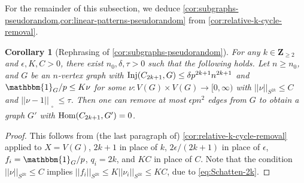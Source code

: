 \documentclass[reqno,11pt]{amsart}
\newtheorem{corollary}[theorem]{Corollary}
\theoremstyle{definition}
\theoremstyle{remark}
\newtheorem*{remark}{Remark}
\numberwithin{equation}{section}
\newcommand{\Z}{\mathbf{Z}}
\newcommand{\one}{\mathbbm{1}}
\newcommand{\sq}{_{\substack{ \\ \square}}}
\newcommand{\Hom}{\textnormal{Hom}}
\newcommand{\Inj}{\textnormal{Inj}}
\begin{document}
For the remainder of this subsection, we deduce \cref{cor:subgraphs-pseudorandom,cor:linear-patterns-pseudorandom} from \cref{cor:relative-k-cycle-removal}. 

\begin{corollary}[Rephrasing of \cref{cor:subgraphs-pseudorandom}]
For any $k \in \Z_{\ge 2}$ and $\epsilon, K, C > 0$, there exist $n_0, \delta, \tau > 0$ such that the following holds. Let $n \ge n_0$, and $G$ be an $n$-vertex graph with $\Inj(C_{2k+1}, G) \le \delta p^{2k+1} n^{2k+1}$ and $\one_G/p \le K\nu$ for some $\nu : V(G) \times V(G) \to [0, \infty)$ with $||\nu||_{S^{2k}} \le C$ and $||\nu - 1||\sq \le \tau$. Then one can remove at most $\epsilon p n^2$ edges from $G$ to obtain a graph $G'$ with $\Hom(C_{2k+1}, G') = 0$.
\end{corollary}

\begin{proof}
This follows from (the last paragraph of) \cref{cor:relative-k-cycle-removal} applied to $X = V(G)$, $2k+1$ in place of $k$, $2\epsilon/(2k+1)$ in place of $\epsilon$, $f_i = \one_G/p$, $q_i = 2k$, and $KC$ in place of $C$. Note that the condition $||\nu ||_{S^{2k}} \le C$ implies $||f_i||_{S^{2k}} \le K ||\nu_i||_{S^{2k}} \le KC$, due to \cref{eq:Schatten-2k}.
\end{proof}

\end{document}
